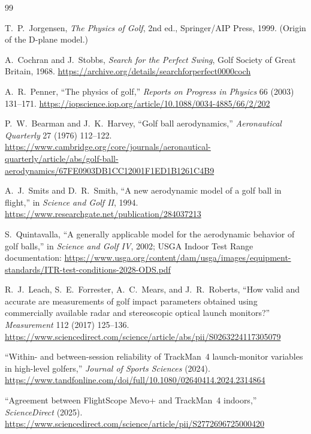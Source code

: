 \begin{thebibliography}{99}
\raggedright


T.~P.~Jorgensen, \emph{The Physics of Golf}, 2nd ed., Springer/AIP Press,
1999. (Origin of the D-plane model.)

A.~Cochran and J.~Stobbs, \emph{Search for the Perfect Swing}, Golf
Society of Great Britain, 1968.
\url{https://archive.org/details/searchforperfect0000coch}

A.~R.~Penner, ``The physics of golf,'' \emph{Reports on Progress in
Physics} 66 (2003) 131--171.
\url{https://iopscience.iop.org/article/10.1088/0034-4885/66/2/202}

P.~W.~Bearman and J.~K.~Harvey, ``Golf ball aerodynamics,''
\emph{Aeronautical Quarterly} 27 (1976) 112--122.
\url{https://www.cambridge.org/core/journals/aeronautical-quarterly/article/abs/golf-ball-aerodynamics/67FE0903DB1CC12001F1ED1B1261C4B9}

A.~J.~Smits and D.~R.~Smith, ``A new aerodynamic model of a golf ball in
flight,'' in \emph{Science and Golf II}, 1994.
\url{https://www.researchgate.net/publication/284037213}

S.~Quintavalla, ``A generally applicable model for the aerodynamic
behavior of golf balls,'' in \emph{Science and Golf IV}, 2002; USGA
Indoor Test Range documentation:
\url{https://www.usga.org/content/dam/usga/images/equipment-standards/ITR-test-conditions-2028-ODS.pdf}

R.~J.~Leach, S.~E.~Forrester, A.~C.~Mears, and J.~R.~Roberts, ``How valid
and accurate are measurements of golf impact parameters obtained using
commercially available radar and stereoscopic optical launch monitors?''
\emph{Measurement} 112 (2017) 125--136.
\url{https://www.sciencedirect.com/science/article/abs/pii/S0263224117305079}

``Within- and between-session reliability of TrackMan~4 launch-monitor
variables in high-level golfers,'' \emph{Journal of Sports Sciences}
(2024). \url{https://www.tandfonline.com/doi/full/10.1080/02640414.2024.2314864}

``Agreement between FlightScope Mevo+ and TrackMan~4 indoors,''
\emph{ScienceDirect} (2025).
\url{https://www.sciencedirect.com/science/article/pii/S2772696725000420}


\end{thebibliography}
